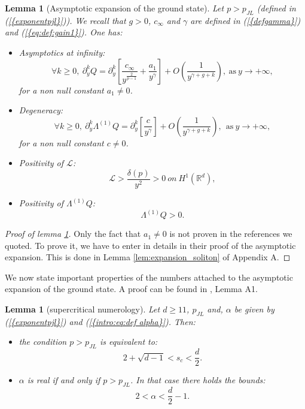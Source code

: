 \documentclass[11pt,a4paper,reqno]{amsart}
\newtheorem{lemma}[theorem]{Lemma}
\theoremstyle{remark}
\numberwithin{equation}{section}
\begin{document}
\begin{lemma}[Asymptotic expansion of the ground state] Let $p>p_{JL}$ (defined in {{\rm (\ref{{exponentpjl}})}}). We recall that $g>0$, $c_{\infty}$ and $\gamma $ are defined in {{\rm (\ref{{defgamma}})}} and {{\rm (\ref{{eq:def:gain1}})}}. One has:
\label{lem:Q}
\begin{itemize}
\item[(i)]\emph{Asymptotics at infinity:}
\begin{equation} \label{linearized:eq:asymptotique soliton}
\forall k\geq 0, \ \partial^k_y Q=\partial^k_y \left[ \frac{c_{\infty}}{y^{\frac{2}{p-1}}}+\frac{a_1}{y^{\gamma}}\right]+O\left( \frac{1}{y^{\gamma+g+k}}\right), \ \text{as} \ y \rightarrow +\infty,
\end{equation}
for a non null constant $a_1\neq 0$.
\item[(ii)]\emph{Degeneracy:}
\begin{equation}\label{eq:degenerescencesoliton}
\forall k\geq 0, \ \partial^k_y \Lambda^{(1)} Q =\partial^k_y \left[ \frac{c}{y^{\gamma}} \right]+O\left( \frac{1}{y^{\gamma+g+k}}\right), \ \ \text{as} \ y \rightarrow +\infty,
\end{equation}
for a non null constant $c\neq 0$.
\item[(iii)]\emph{Positivity of $\mathcal{L}$:}
\begin{equation}\label{positivitelinearise}
\mathcal{L}>\frac{\delta(p)}{y^2}>0 \ on \ H^1(\mathbb{R}^d),
\end{equation} 
\item[(iv)]\emph{Positivity of $\Lambda^{(1)}Q$:}
\begin{equation}\label{cons:eq:positivite lambdaQ}
\Lambda^{(1)}Q>0.
\end{equation} 
\end{itemize}
\end{lemma}

\begin{proof}[Proof of lemma \ref{lem:Q}]
Only the fact that $a_1\neq 0$ is not proven in the references we quoted. To prove it, we have to enter in details in their proof of the asymptotic expansion. This is done in Lemma \ref{lem:expansion_soliton} of Appendix A.
\end{proof}

We now state important properties of the numbers attached to the asymptotic expansion of the ground state. A proof can be found in \cite{MRRod2}, Lemma A1.

\begin{lemma}[supercritical numerology]\label{annexe:lem:valeur dalpha}
Let $d\geq 11$, $p_{JL}$ and, $\alpha$ be given by {{\rm (\ref{{exponentpjl}})}} and {{\rm (\ref{{intro:eq:def alpha}})}}. Then:
\begin{itemize}
\item[(i)]the condition $p>p_{JL}$ is equivalent to:
$$
2+\sqrt{d-1}<s_c<\frac{d}{2} .
$$
\item[(ii)]$\alpha$ is real if and only if $p>p_{JL}$. In that case there holds the bounds:
$$
2<\alpha<\frac{d}{2}-1 .
$$
\end{itemize}
\end{lemma}
\end{document}
